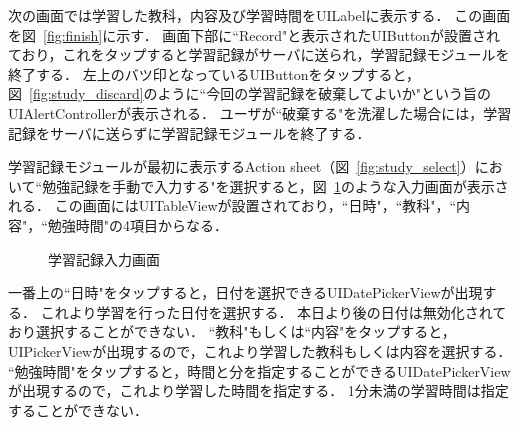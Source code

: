 次の画面では学習した教科，内容及び学習時間をUILabelに表示する．
この画面を図~\ref{fig:finish}に示す．
画面下部に``Record"と表示されたUIButtonが設置されており，これをタップすると学習記録がサーバに送られ，学習記録モジュールを終了する．
左上のバツ印となっているUIButtonをタップすると，図~\ref{fig:study_discard}のように``今回の学習記録を破棄してよいか"という旨のUIAlertControllerが表示される．
ユーザが``破棄する"を洗濯した場合には，学習記録をサーバに送らずに学習記録モジュールを終了する．

学習記録モジュールが最初に表示するAction sheet（図~\ref{fig:study_select}）において``勉強記録を手動で入力する"を選択すると，図~\ref{fig:study_input}のような入力画面が表示される．
この画面にはUITableViewが設置されており，``日時"，``教科"，``内容"，``勉強時間"の4項目からなる．

\begin{figure}[hb]
	\begin{center}
	\caption{学習記録入力画面}
	\label{fig:study_input}
	\end{center}
\end{figure}

一番上の``日時"をタップすると，日付を選択できるUIDatePickerViewが出現する．
これより学習を行った日付を選択する．
本日より後の日付は無効化されており選択することができない．
``教科"もしくは``内容"をタップすると，UIPickerViewが出現するので，これより学習した教科もしくは内容を選択する．
``勉強時間"をタップすると，時間と分を指定することができるUIDatePickerViewが出現するので，これより学習した時間を指定する．
1分未満の学習時間は指定することができない．

